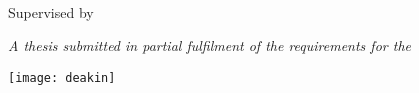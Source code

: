 \vspace*{\fill}
\thispagestyle{empty}
\linespread{1.2}

\centering

\LARGE
\textbf{\thetitle}
\vspace{1 cm}

\Large
\theauthor{}
\\
\vspace{-0.25 cm}
{\normalsize \theauthorspostnominals{}}
\vspace{0.75 cm}

\large
Supervised by \thesupervisor

\vspace{1 cm}

\itshape
A thesis submitted in partial fulfilment of the requirements for the\\
\upshape
\thedegree

\vspace{1.5 cm}
\texttt{[image: deakin]}
\vspace{1.5 cm}

\upshape
\theinstitution

\vspace{1cm}
\thedate
\vspace*{\fill}

\justify
\normalsize
\restoregeometry